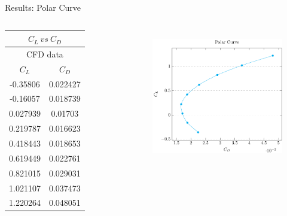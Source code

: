 \documentclass[english,10pt,a4paper,twoside]{beamer}
\begin{document}
	\begin{frame}[shrink = 65]{Results: Polar Curve}	
		\begin{columns}[T] 
			\begin{table}[H]
				\centering
				\begin{tabular}{|cc|}
					\hline
					\multicolumn{2}{|c|}{$C_L ~vs ~C_D$}      \\ \hline
					\multicolumn{2}{|c|}{CFD data}            \\ \hline
					\multicolumn{1}{|c|}{$C_L$}    & $C_D$    \\ \hline
					\multicolumn{1}{|c|}{-0.35806} & 0.022427 \\ \hline
					\multicolumn{1}{|c|}{-0.16057} & 0.018739 \\ \hline
					\multicolumn{1}{|c|}{0.027939} & 0.01703  \\ \hline
					\multicolumn{1}{|c|}{0.219787} & 0.016623 \\ \hline
					\multicolumn{1}{|c|}{0.418443} & 0.018653 \\ \hline
					\multicolumn{1}{|c|}{0.619449} & 0.022761 \\ \hline
					\multicolumn{1}{|c|}{0.821015} & 0.029031 \\ \hline
					\multicolumn{1}{|c|}{1.021107} & 0.037473 \\ \hline
					\multicolumn{1}{|c|}{1.220264} & 0.048051 \\ \hline
				\end{tabular}
			\end{table}
			
			\begin{figure}[H]
				\centering
				\includegraphics[width=0.8\linewidth]{"figures/plar curve lineartex"}
				\label{fig:plar-curve-lineartex}
			\end{figure}
			

\end{columns}
\end{frame}
\end{document}
